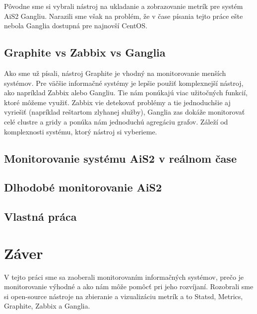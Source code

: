 \documentclass[a4paper, usesections, upjsfrontpage, thesismargins, thesislinespacing, twoside]{rnthesissvk}
\begin{document}
Pôvodne sme si vybrali nástroj na ukladanie a zobrazovanie metrík pre systém AiS2 Gangliu.
Narazili sme však na problém, že v čase písania tejto práce ešte nebola Ganglia dostupná pre najnovší CentOS.


\subsection{Graphite vs Zabbix vs Ganglia}

Ako sme už písali, nástroj Graphite je vhodný na monitorovanie menších systémov.
Pre väčšie informačné systémy je lepšie použiť komplexnejší nástroj, ako napríklad Zabbix alebo Gangliu.
Tie nám ponúkajú viac užitočných funkcií, ktoré môžeme využiť.
Zabbix vie detekovať problémy a tie jednoduchšie aj vyriešiť (napríklad reštartom zlyhanej služby), 
	Ganglia zas dokáže monitorovať celé clustre a gridy a ponúka nám jednoduchú agregáciu grafov.
Záleží od komplexnosti systému, ktorý nástroj si vyberieme.

\subsection{Monitorovanie systému AiS2 v reálnom čase}
\subsection{Dlhodobé monitorovanie AiS2}

\subsection{Vlastná práca}

\newpage

\section{Záver}

V tejto práci sme sa zaoberali monitorovaním informačných systémov, prečo je monitorovanie výhodné a ako nám môže pomôcť pri jeho rozvíjaní.
Rozobrali sme si open-source nástroje na zbieranie a vizualizáciu metrík a to Statsd, Metrics, Graphite, Zabbix a Ganglia.

\end{document}
